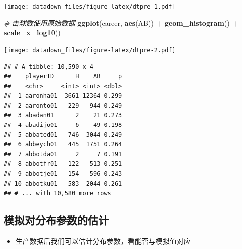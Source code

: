\documentclass[]{book}
\newenvironment{Shaded}{\begin{snugshade}}{\end{snugshade}}
\newcommand{\CommentTok}[1]{\textcolor[rgb]{0.56,0.35,0.01}{\textit{#1}}}
\newcommand{\DataTypeTok}[1]{\textcolor[rgb]{0.13,0.29,0.53}{#1}}
\newcommand{\DecValTok}[1]{\textcolor[rgb]{0.00,0.00,0.81}{#1}}
\newcommand{\KeywordTok}[1]{\textcolor[rgb]{0.13,0.29,0.53}{\textbf{#1}}}
\newcommand{\NormalTok}[1]{#1}
\newcommand{\OperatorTok}[1]{\textcolor[rgb]{0.81,0.36,0.00}{\textbf{#1}}}
\newcommand{\StringTok}[1]{\textcolor[rgb]{0.31,0.60,0.02}{#1}}
\providecommand{\tightlist}{%
  \setlength{\itemsep}{0pt}\setlength{\parskip}{0pt}}
\begin{document}
\texttt{[image: datadown\_files/figure-latex/dtpre-1.pdf]}

\begin{Shaded}
\begin{Highlighting}[]
\CommentTok{# 击球数使用原始数据}
\KeywordTok{ggplot}\NormalTok{(career, }\KeywordTok{aes}\NormalTok{(AB)) }\OperatorTok{+}
\StringTok{  }\KeywordTok{geom_histogram}\NormalTok{() }\OperatorTok{+}
\StringTok{  }\KeywordTok{scale_x_log10}\NormalTok{()}
\end{Highlighting}
\end{Shaded}

\texttt{[image: datadown\_files/figure-latex/dtpre-2.pdf]}

\begin{Shaded}
\end{Shaded}

\begin{verbatim}
## # A tibble: 10,590 x 4
##    playerID      H    AB     p
##    <chr>     <int> <int> <dbl>
##  1 aaronha01  3661 12364 0.299
##  2 aaronto01   229   944 0.249
##  3 abadan01      2    21 0.273
##  4 abadijo01     6    49 0.198
##  5 abbated01   746  3044 0.249
##  6 abbeych01   445  1751 0.264
##  7 abbotda01     2     7 0.191
##  8 abbotfr01   122   513 0.251
##  9 abbotje01   154   596 0.243
## 10 abbotku01   583  2044 0.261
## # ... with 10,580 more rows
\end{verbatim}

\subsection{模拟对分布参数的估计}

\begin{itemize}
\tightlist
\item
  生产数据后我们可以估计分布参数，看能否与模拟值对应
\end{itemize}
\end{document}
